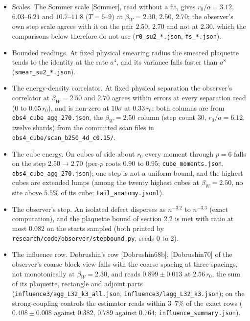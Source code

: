 \documentclass[10pt,letterpaper,twocolumn]{article}
\providecommand{\tightlist}{\setlength{\itemsep}{0pt}\setlength{\parskip}{0pt}}
\begin{document}
\begin{itemize}
\tightlist
\item
  Scales. The Sommer scale {[}Sommer{]}, read without a fit, gives \(r_0/a=3.12\), \(6.03\)--\(6.21\) and \(10.7\)--\(11.8\) (\(T=6\)--\(9\)) at \(\beta_W=2.30\), \(2.50\), \(2.70\); the observer's own step scale agrees with it on the pair \(2.50\), \(2.70\) and not at \(2.30\), which the comparisons below therefore do not use (\texttt{r0\_\allowbreak{}su2\_\allowbreak{}*\allowbreak{}.\allowbreak{}json}, \texttt{fs\_\allowbreak{}*\allowbreak{}.\allowbreak{}json}).
\item
  Bounded readings. At fixed physical smearing radius the smeared plaquette tends to the identity at the rate \(a^4\), and its variance falls faster than \(a^8\) (\texttt{smear\_\allowbreak{}su2\_\allowbreak{}*\allowbreak{}.\allowbreak{}json}).
\item
  The energy-density correlator. At fixed physical separation the observer's correlator at \(\beta_W=2.50\) and \(2.70\) agrees within errors at every separation read (\(0\) to \(0.65\,r_0\)), and is non-zero at \(10\sigma\) at \(0.33\,r_0\); both columns are from \texttt{obs4\_\allowbreak{}cube\_\allowbreak{}agg\_\allowbreak{}270.\allowbreak{}json}, the \(\beta_W=2.50\) column (step count \(30\), \(r_0/a=6.12\), twelve shards) from the committed scan files in \texttt{obs4\_\allowbreak{}cube/\allowbreak{}scan\_\allowbreak{}b250\_\allowbreak{}4d\_\allowbreak{}c0.\allowbreak{}15/\allowbreak{}}.
\item
  The cube energy. On cubes of side about \(r_0\) every moment through \(p=6\) falls on the step \(2.50\to2.70\) (per-\(p\) roots \(0.90\) to \(0.95\); \texttt{cube\_\allowbreak{}moments.\allowbreak{}json}, \texttt{obs4\_\allowbreak{}cube\_\allowbreak{}agg\_\allowbreak{}270.\allowbreak{}json}); one step is not a uniform bound, and the highest cubes are extended lumps (among the twenty highest cubes at \(\beta_W=2.50\), no site above \(5.5\%\) of its cube; \texttt{tail\_\allowbreak{}anatomy.\allowbreak{}jsonl}).
\item
  The observer's step. An isolated defect disperses as \(n^{-3.2}\) to \(n^{-3.3}\) (exact computation), and the plaquette bound of section 2.2 is met with ratio at most \(0.082\) on the starts sampled (both printed by \texttt{research/\allowbreak{}code/\allowbreak{}observer/\allowbreak{}stepbound.\allowbreak{}py}, seeds 0 to 2).
\item
  The influence row. Dobrushin's row {[}Dobrushin68b{]}, {[}Dobrushin70{]} of the observer's coarse block view falls with the coarse spacing at three spacings, not monotonically at \(\beta_W=2.30\), and reads \(0.899\pm0.013\) at \(2.56\,r_0\), the sum of its plaquette, rectangle and adjoint parts (\texttt{influence3/\allowbreak{}agg\_\allowbreak{}L32\_\allowbreak{}k3\_\allowbreak{}all.\allowbreak{}json}, \texttt{influence3/\allowbreak{}lagg\_\allowbreak{}L32\_\allowbreak{}k3.\allowbreak{}json}); on the strong-coupling controls the estimator reads within \(3\)--\(7\%\) of the exact rows (\(0.408\pm0.008\) against \(0.382\), \(0.789\) against \(0.764\); \texttt{influence\_\allowbreak{}summary.\allowbreak{}json}).

\end{itemize}
\end{document}
